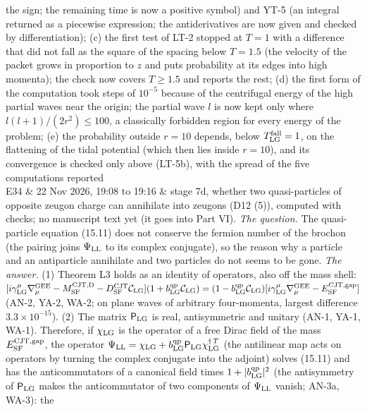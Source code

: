 \documentclass[
  10pt,
]{article}
\begin{document}
\begin{longtable}[]
the sign; the remaining time is now a positive symbol) and YT-5 (an
integral returned as a piecewise expression; the antiderivatives are now
given and checked by differentiation); (c) the first test of LT-2
stopped at \(T=1\) with a difference that did not fall as the square of
the spacing below \(T=1.5\) (the velocity of the packet grows in
proportion to \(z\) and puts probability at its edges into high
momenta); the check now covers \(T\ge1.5\) and reports the rest; (d) the
first form of the computation took steps of \(10^{-5}\) because of the
centrifugal energy of the high partial waves near the origin; the
partial wave \(l\) is now kept only where \(l(l+1)/(2r^2)\le100\), a
classically forbidden region for every energy of the problem; (e) the
probability outside \(r=10\) depends, below \(T^{\rm fall}_{\rm LG}=1\),
on the flattening of the tidal potential (which then lies inside
\(r=10\)), and its convergence is checked only above (LT-5b), with the
spread of the five computations reported \\
E34 & 22 Nov 2026, 19:08 to 19:16 & stage 7d, whether two
quasi-particles of opposite zeugon charge can annihilate into zeugons
(D12 (5)), computed with checks; no manuscript text yet (it goes into
Part VI). \emph{The question.} The quasi-particle equation (15.11) does
not conserve the fermion number of the brochon (the pairing joins
\(\Psi_{\rm LL}\) to its complex conjugate), so the reason why a
particle and an antiparticle annihilate and two particles do not seems
to be gone. \emph{The answer.} (1) Theorem L3 holds as an identity of
operators, also off the mass shell:
\([i\gamma^\mu_{\rm LG}\nabla^{\rm GEE}_\mu-M^{\rm CJT,D}_{\rm SF}-D^{\rm CJT}_{\rm SF}\mathcal C_{\rm LG}](1+b^{\rm qp}_{\rm LG}\mathcal C_{\rm LG})=(1-b^{\rm qp}_{\rm LG}\mathcal C_{\rm LG})[i\gamma^\mu_{\rm LG}\nabla^{\rm GEE}_\mu-E^{\rm CJT,gap}_{\rm SF}]\)
(AN-2, YA-2, WA-2; on plane waves of arbitrary four-momenta, largest
difference \(3.3\times10^{-15}\)). (2) The matrix \(\mathsf P_{\rm LG}\)
is real, antisymmetric and unitary (AN-1, YA-1, WA-1). Therefore, if
\(\chi_{\rm LG}\) is the operator of a free Dirac field of the mass
\(E^{\rm CJT,gap}_{\rm SF}\), the operator
\(\Psi_{\rm LL}=\chi_{\rm LG}+b^{\rm qp}_{\rm LG}\mathsf P_{\rm LG}\chi_{\rm LG}^{\dagger\,T}\)
(the antilinear map acts on operators by turning the complex conjugate
into the adjoint) solves (15.11) and has the anticommutators of a
canonical field times \(1+\lvert b^{\rm qp}_{\rm LG}\rvert^2\) (the
antisymmetry of \(\mathsf P_{\rm LG}\) makes the anticommutator of two
components of \(\Psi_{\rm LL}\) vanish; AN-3a, WA-3): the

\end{longtable}
\end{document}
